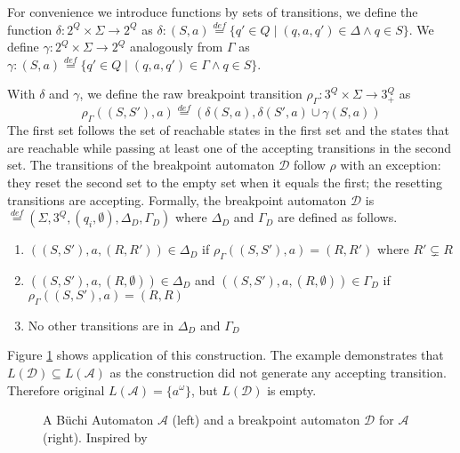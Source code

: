 \documentclass[
	digital,
nolof, nolot
]{fithesis3}
\newcommand{\cA}{\mathcal{A}}
\newcommand{\cD}{\mathcal{D}}
\newcommand{\lA}{L(\cA)}
\newcommand{\lD}{L(\cD)}
\newcommand{\eqdef}{\overset{def}{=}}
\begin{document}
			For convenience we introduce functions by sets of transitions, we define the function $\delta \colon 2^Q \times \Sigma \rightarrow 2^Q$ as 	
			$\delta\colon (S,a)\eqdef\{q'\in Q \mid  (q,a,q') \in \Delta \land q \in S\}$.
			We define $\gamma:2^Q  \times \Sigma \rightarrow 2^Q$ analogously from $\Gamma$ as $\gamma\colon (S,a)\eqdef\{q'\in Q \mid  (q,a,q') \in \Gamma \land q \in S\}$.
			
			
			With $\delta$ and $\gamma$, we define the raw breakpoint transition
			$\rho_\Gamma \colon 3^Q \times \Sigma \rightarrow 3^Q_+$ as
			\[\rho_\Gamma((S, S'), a) \eqdef(\delta(S, a), \delta(S',a)\cup \gamma(S, a))\]
			The first set follows the set of reachable states in the first set and the states that are reachable while passing at least one of the accepting transitions in the second set.
			The transitions of the breakpoint automaton $\cD$ follow $\rho$ with an exception: they reset the second set to the empty set when it equals the first; the resetting transitions are accepting.
			Formally, the breakpoint automaton $\cD$ is $ \eqdef (\Sigma, 3^Q, (q_i, \emptyset), \Delta_D, \Gamma_D)$ where $\Delta_D$ and $\Gamma_D$ are defined as follows. 
			
			\begin{enumerate}
				\item $((S, S'), a, (R, R')) \in \Delta_D$ if $\rho_\Gamma((S,S'),a)=(R,R')$ where $R' \subsetneq R$
				\item \label{reset}$((S, S'), a, (R, \emptyset)) \in \Delta_D$ and $((S, S'), a, (R, \emptyset)) \in \Gamma_D$ if $\rho_\Gamma((S,S'),a)=(R,R)$ 
				\item No other transitions are in $\Delta_D$ and $\Gamma_D$
			\end{enumerate}
			
			Figure \ref{fig:bp:non-equivalent} shows application of this construction. The example demonstrates that $\lD \subseteq \lA$ as the construction did not generate any accepting transition. Therefore original $\lA=\{a^\omega\}$, but $\lD$ is empty. 
			
			
			
			\begin{figure}[ht]
				\begin{center}
					
					
				\end{center}
				\caption{A Büchi Automaton $\cA$ (left) and a breakpoint automaton $\cD$ for $\cA$ (right). Inspired by \cite[Figure~7.3]{Blahoudek2018thesis}}
				\label{fig:bp:non-equivalent}
			\end{figure}
		
\end{document}
